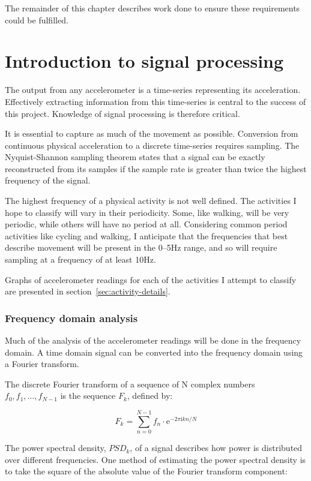     The remainder of this chapter describes work done to ensure these requirements could be fulfilled.
  
  \section{Introduction to signal processing}
    \label{sec:intro-sig-processing}
    The output from any accelerometer is a time-series representing its acceleration. Effectively extracting information from this time-series is central to the success of this project. Knowledge of signal processing is therefore critical.
    
    It is essential to capture as much of the movement as possible. Conversion from continuous 
    physical acceleration to a discrete time-series requires sampling. The Nyquist-Shannon sampling theorem states that a signal can be exactly reconstructed from its samples if the sample rate is greater than twice the highest frequency of the signal.
    
    The highest frequency of a physical activity is not well defined. The activities I hope to classify will vary in their periodicity. Some, like walking, will be very periodic, while others will have no period at all. Considering common period activities like cycling and walking, I anticipate that the frequencies that best describe movement will be present in the 0--5\si{Hz} range, and so will require sampling at a frequency of at least 10\si{Hz}.
    
    Graphs of accelerometer readings for each of the activities I attempt to classify are presented in section~\ref{sec:activity-details}. 
    
    \subsubsection{Frequency domain analysis}
      Much of the analysis of the accelerometer readings will be done in the frequency domain. A time domain signal can be converted into the frequency domain using a Fourier transform.
      
      The discrete Fourier transform of a sequence of N complex numbers $f_0, f_1, \ldots, f_{N-1}$ is the sequence $F_k$, defined by:
      
      $$F_k = \sum\limits_{n=0}^{N-1} f_n \cdot \mathrm{e}^{-2\pi \mathrm{i} kn/N}$$
      
      The power spectral density, $PSD_k$, of a signal describes how power is distributed over different frequencies. One method of estimating the power spectral density is to take the square of the absolute value of the Fourier transform component:
      
